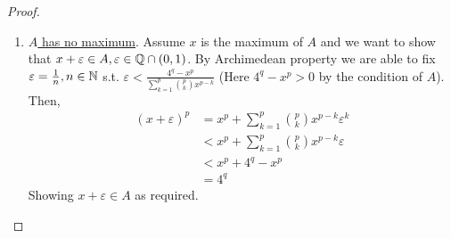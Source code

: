 \documentclass{homework}
\newcommand{\Q}{\bb{Q}} %
\newcommand{\N}{\bb{N}} %
\newcommand{\?}{\stackrel{?}{=}}
\newcommand{\ep}{\varepsilon}
\theoremstyle{definition}
\begin{document}
\begin{proof}
\begin{enumerate}
        \item \underline{$A$ has no maximum}. Assume $x$ is the maximum of $A$ and we want to show that $x+\ep\in A, \ep\in\Q\cap(0,1)$. By Archimedean property we are able to fix $\ep=\frac{1}{n},n\in\N$ s.t. $\ep<\frac{4^q-x^p}{\sum_{k=1}^p\binom{p}{k}x^{p-k}}$ (Here $4^q-x^p>0$ by the condition of $A$). Then, \begin{align*}
            (x+\ep)^p&=x^p+\sum_{k=1}^p\binom{p}{k}x^{p-k}\ep^{k}\\
            &<x^p+\sum_{k=1}^p\binom{p}{k}x^{p-k}\ep\\
            &<x^p+4^q-x^p\\
            &=4^q
        \end{align*}  
Showing $x+\ep\in A$ as required. 
    \end{enumerate}
\end{proof}
\end{document}
